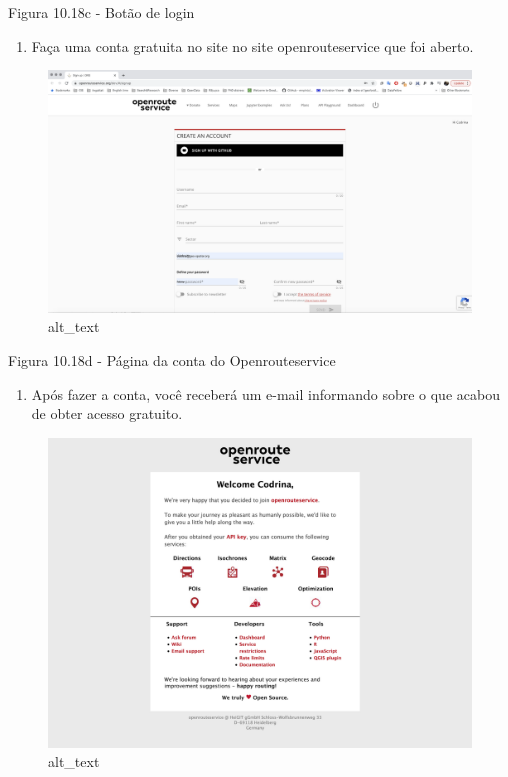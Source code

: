 \documentclass[
]{book}
\providecommand{\tightlist}{%
  \setlength{\itemsep}{0pt}\setlength{\parskip}{0pt}}
\begin{document}
Figura 10.18c - Botão de login

\begin{enumerate}
\def\labelenumi{\arabic{enumi}.}
\setcounter{enumi}{1}
\tightlist
\item
  Faça uma conta gratuita no site no site openrouteservice que foi aberto.
\end{enumerate}

\begin{figure}
\centering
\includegraphics{media/modulo10/fig1018_d.png}
\caption{alt\_text}
\end{figure}

Figura 10.18d - Página da conta do Openrouteservice

\begin{enumerate}
\def\labelenumi{\arabic{enumi}.}
\setcounter{enumi}{2}
\tightlist
\item
  Após fazer a conta, você receberá um e-mail informando sobre o que acabou de obter acesso gratuito.
\end{enumerate}

\begin{figure}
\centering
\includegraphics{media/modulo10/fig1018_e.png}
\caption{alt\_text}
\end{figure}
\end{document}
